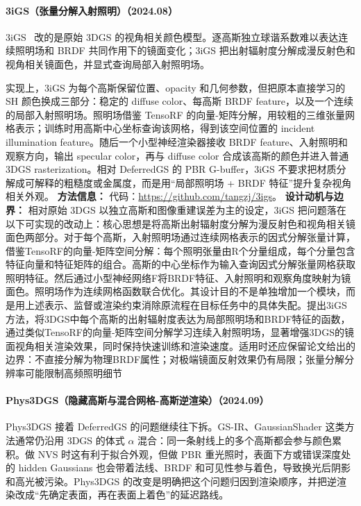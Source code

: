 \paragraph{3iGS（张量分解入射照明）（2024.08）}
3iGS~\cite{2408_03753} 改的是原始 3DGS 的视角相关颜色模型。逐高斯独立球谐系数难以表达连续照明场和 BRDF 共同作用下的镜面变化；3iGS 把出射辐射度分解成漫反射色和视角相关镜面色，并显式查询局部入射照明场。

实现上，3iGS 为每个高斯保留位置、opacity 和几何参数，但把原本直接学习的 SH 颜色换成三部分：稳定的 diffuse color、每高斯 BRDF feature，以及一个连续的局部入射照明场。照明场借鉴 TensoRF 的向量-矩阵分解，用较粗的三维张量网格表示；训练时用高斯中心坐标查询该网格，得到该空间位置的 incident illumination feature。随后一个小型神经渲染器接收 BRDF feature、入射照明和观察方向，输出 specular color，再与 diffuse color 合成该高斯的颜色并进入普通 3DGS rasterization。相对 DeferredGS 的 PBR G-buffer，3iGS 不要求把材质分解成可解释的粗糙度或金属度，而是用“局部照明场 + BRDF 特征”提升复杂视角相关外观。
\textbf{方法信息：} 代码：\url{https://github.com/tangzj/3igs}。
\textbf{设计动机与边界：} 相对原始 3DGS 以独立高斯和图像重建误差为主的设定，3iGS 把问题落在以下可实现的改动上：核心思想是将高斯出射辐射度分解为漫反射色和视角相关镜面色两部分。对于每个高斯，入射照明场通过连续网格表示的因式分解张量计算，借鉴TensoRF的向量-矩阵空间分解：每个照明张量由R个分量组成，每个分量包含特征向量和特征矩阵的组合。高斯的中心坐标作为输入查询因式分解张量网格获取照明特征。然后通过小型神经网络F将BRDF特征、入射照明和观察角度映射为镜面色。照明场作为连续网格函数联合优化。其设计目的不是单独增加一个模块，而是用上述表示、监督或渲染约束消除原流程在目标任务中的具体失配。提出3iGS方法，将3DGS中每个高斯的出射辐射度表达为局部照明场和BRDF特征的函数，通过类似TensoRF的向量-矩阵空间分解学习连续入射照明场，显著增强3DGS的镜面视角相关渲染效果，同时保持快速训练和渲染速度。适用时还应保留论文给出的边界：不直接分解为物理BRDF属性；对极端镜面反射效果仍有局限；张量分解分辨率可能限制高频照明细节
\paragraph{Phys3DGS（隐藏高斯与混合网格-高斯逆渲染）（2024.09）\cite{2409_10335}}
Phys3DGS 接着 DeferredGS 的问题继续往下拆。GS-IR、GaussianShader 这类方法通常仍沿用 3DGS 的体式 $\alpha$ 混合：同一条射线上的多个高斯都会参与颜色累积。做 NVS 时这有利于拟合外观，但做 PBR 重光照时，表面下方或错误深度处的 hidden Gaussians 也会带着法线、BRDF 和可见性参与着色，导致换光后阴影和高光被污染。Phys3DGS 的改变是明确把这个问题归因到渲染顺序，并把逆渲染改成“先确定表面，再在表面上着色”的延迟路线。

